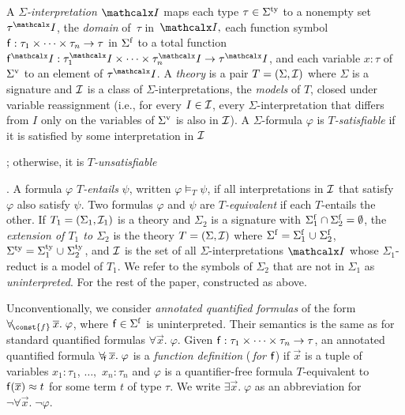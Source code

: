 
A \emph{$\Sigma$-interpretation $\I$} %
maps each type $\tau \in \stypes{\Sigma}$ to a nonempty set $\tau^\I$,
the \emph{domain} of~$\tau$ in~$\I,$
each function symbol $\mathsf{f} : \tau_1 \times \cdots \times \tau_n \rightarrow \tau$ in $\sfuns{\Sigma}$
to a total function $\con{f}^\I : \tau_1^\I \times \cdots \times \tau_n^\I \rightarrow \tau^\I$,
and each variable $x:\tau$ of $\svars{\Sigma}$ to an element of $\tau^\I$.
A \emph{theory} is a pair $T = (\Sigma, \Mo)$ where
$\Sigma$ is a signature and ${\mathcal{I}}$ is a class of $\Sigma$-interpretations,
the \emph{models} of $T$, closed under variable reassignment
(i.e., for every $I \in {\mathcal{I}}$, every $\Sigma$-interpretation that differs
from $I$ only on the variables of $\svars \Sigma$ is also in ${\mathcal{I}}$).
A $\Sigma$-formula $\varphi$ is \emph{$T$-satisfiable}
if it is satisfied by some interpretation in ${\mathcal{I}}$\begin{rep};
otherwise, it is \emph{$T$-unsatisfiable}\end{rep}.
A formula $\varphi$ \emph{$T$-entails} $\psi$, written $\varphi \models_T \psi$,
if all interpretations in ${\mathcal{I}}$ that satisfy $\varphi$ also satisfy $\psi$.
Two formulas $\varphi$ and $\psi$ are \emph{$T$-equivalent}
if each $T$-entails the other.
If $T_1 = (\Sigma_1, \Mo_1)$ is a theory and $\Sigma_2$ is a signature
with $\sfuns{\Sigma_1} \cap \sfuns{\Sigma_2} = \emptyset$,
the \emph{extension of $T_1$ to $\Sigma_2$} is the theory $T = (\Sigma, \Mo)$ where
$\sfuns{\Sigma} = \sfuns{\Sigma_1} \cup \sfuns{\Sigma_2}$,
$\stypes{\Sigma} = \stypes{\Sigma_1} \cup \stypes{\Sigma_2}$,
and ${\mathcal{I}}$ is the set of all $\Sigma$-interpretations $\I$
whose $\Sigma_1$-reduct is a model of $T_1$.
We refer to the symbols of $\Sigma_2$ that are not in $\Sigma_1$ as \emph{uninterpreted}.
For the rest of the paper,  constructed as above.

Unconventionally,
we consider \emph{annotated quantified formulas} of the form
$\forallf{\const{f}} \vec x.\; \varphi$, where $\con{f} \in \sfuns{\Sigma}$ is
uninterpreted. Their
semantics is the same as for standard quantified formulas $\forall \vec x.\; \varphi$.
Given $\mathsf{f} : \tau_1 \times \cdots \times \tau_n \rightarrow \tau$,
an annotated
quantified formula $\forall_{\!\mathsf{f}\:} \overline{x}.\; \varphi$ is a \emph{function definition}
(\,\emph{for $\mathsf{f}$}\vthinspace) if $\vec x$ is a tuple of variables
$x_1 : \tau_1$, $\ldots,$ $x_n : \tau_n$
and $\varphi$ is a quantifier-free formula
$T$-equivalent to $\mathsf{f}( \overline{x} ) \approx t$ for some term $t$ of type $\tau$.
We write $\exists
\vec x.\; \varphi$ as an abbreviation for $\neg \forall \vec x.\; \neg \varphi$.

